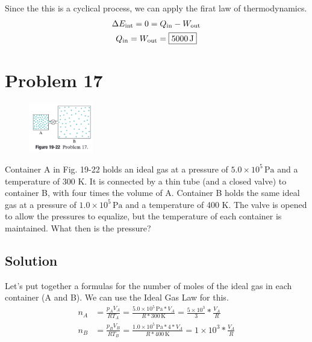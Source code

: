 \documentclass[12pt]{article}
\begin{document}
            Since the this is a cyclical process, we can apply the firat law of thermodynamics.
            \begin{gather}
                \Delta E_{\rm int}  =   0   =   Q_{\rm in} - W_{\rm out}\\
                Q_{\rm in}  =   W_{\rm out} =   \boxed{5000\,\unit{\joule}}
            \end{gather}

    \pagebreak
    \section{Problem 17}
        \begin{figure}
            \vspace{-30pt}
            \includegraphics[width=0.25\textwidth]{picture_19-22.png} 
        \end{figure}
        Container A in Fig. 19-22 holds an ideal gas at a pressure of $5.0 \times 10^5\,\unit{\pascal}$ and a temperature of 300 K. 
        It is connected by a thin tube (and a closed valve) to container B, with four times the volume of A. 
        Container B holds the same ideal gas at a pressure of $1.0 \times 10^5\,\unit{\pascal}$ and a temperature of 400 K. 
        The valve is opened to allow the pressures to equalize, but the temperature of each container is maintained. 
        What then is the pressure?

        \subsection{Solution}
            Let's put together a formulas for the number of moles of the ideal gas in each container (A and B). 
            We can use the Ideal Gas Law for this.
            \begin{align}
                n_A &=  \frac{p_A V_A}{R T_A}
                    =   \frac{5.0 \times 10^5\,\unit{\pascal} * V_A}{R * 300\,\unit{\kelvin}}
                    =   \frac{5 \times 10^3}{3} * \frac{V_A}{R}\\
                n_B &=  \frac{p_B V_B}{R T_B}
                    =   \frac{1.0 \times 10^5\,\unit{\pascal} * 4 * V_A}{R * 400\,\unit{\kelvin}}
                    =   1 \times 10^3 * \frac{V_A}{R}
            \end{align}
\end{document}
